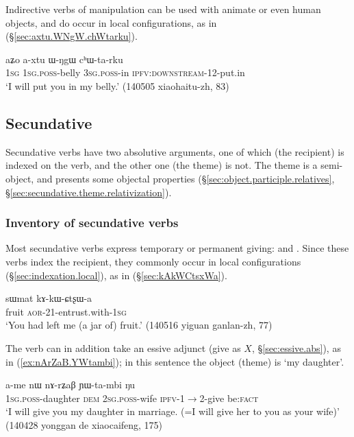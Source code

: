 Indirective verbs of manipulation can be used with animate or even human objects, and do occur in local configurations, as in (§\ref{sec:axtu.WNgW.chWtarku}).

\begin{exe}
	\ex \label{sec:axtu.WNgW.chWtarku}
	\gll  aʑo a-xtu ɯ-ŋgɯ cʰɯ-ta-rku \\
	\textsc{1sg} \textsc{1sg}.\textsc{poss}-belly \textsc{3sg}.\textsc{poss}-in \textsc{ipfv}:\textsc{downstream}-1\fl{}2-put.in \\
	\glt `I will put you in my belly.' (140505 xiaohaitu-zh, 83)
\end{exe}

\subsection{Secundative} \label{sec:ditransitive.secundative}
Secundative verbs have two absolutive arguments, one of which (the recipient) is indexed on the verb, and the other one (the theme) is not. The theme is a semi-object, and presents some objectal properties (§\ref{sec:object.participle.relatives}, §\ref{sec:secundative.theme.relativization}).

\subsubsection{Inventory of secundative verbs}
Most secundative verbs express temporary or permanent giving:  and . Since these verbs index the recipient, they commonly occur in local configurations (§\ref{sec:indexation.local}), as in (§\ref{sec:kAkWCtsxWa}).

\begin{exe}
	\ex \label{sec:kAkWCtsxWa}
	\gll  sɯmat kɤ-kɯ-ɕtʂɯ-a \\
	fruit \textsc{aor}-2\fl{}1-entrust.with-\textsc{1sg} \\
	\glt `You had left me (a jar of) fruit.' (140516 yiguan ganlan-zh, 77)
\end{exe}

The verb  can in addition take an essive adjunct (give as $X$, §\ref{sec:essive.abs}), as  in (\ref{ex:nArZaB.YWtambi}); in this sentence the object (theme) is  `my daughter'.

\begin{exe}
	\ex \label{ex:nArZaB.YWtambi}
	\gll   a-me nɯ nɤ-rʑaβ ɲɯ-ta-mbi ŋu \\
	\textsc{1sg}.\textsc{poss}-daughter \textsc{dem} \textsc{2sg}.\textsc{poss}-wife \textsc{ipfv}-1$\rightarrow$2-give be:\textsc{fact} \\
	\glt `I will give you my daughter in marriage. (=I will give her to you as your wife)' (140428 yonggan de xiaocaifeng, 175)
\end{exe}

